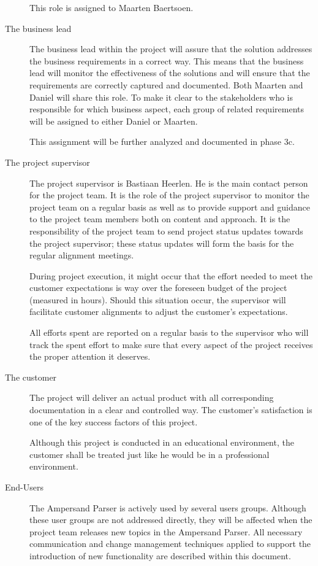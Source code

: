\begin{description}
	This role is assigned to Maarten Baertsoen.

	\item[The business lead]
	The business lead within the project will assure that the solution addresses the business requirements in a correct way. 
	This means that the business lead will monitor the effectiveness of the solutions and will ensure that the requirements are correctly captured and documented.
	Both Maarten and Daniel will share this role.
	To make it clear to the stakeholders who is responsible for which business aspect, each group of related requirements will be assigned to either Daniel or Maarten.

	This assignment  will be further analyzed and documented in phase 3c.

	\item[The project supervisor]
	The project supervisor is Bastiaan Heerlen.
	He is the main contact person for the project team.
	It is the role of the project supervisor to monitor the project team on a regular basis as well as to provide support and guidance to the project team members both on content and approach.
	It is the responsibility of the project team to send project status updates towards the project supervisor; these status updates will form the basis for the regular alignment meetings.

	During project execution, it might occur that the effort needed to meet the customer expectations is way over the foreseen budget of the project (measured in hours).
	Should this situation occur, the supervisor will facilitate customer alignments to adjust the customer's expectations.

	All efforts spent are reported on a regular basis to the supervisor who will track the spent effort to make sure that every aspect of the project receives the proper attention it deserves.

	\item[The customer]
	The project will deliver an actual product with all corresponding documentation in a clear and controlled way.
	The customer's satisfaction is one of the key success factors of this project.

	Although this project is conducted in an educational environment, the customer shall be treated just like he would be in a professional environment.

	\item[End-Users]
	The Ampersand Parser is actively used by several users groups.
	Although these user groups are not addressed directly, they will be affected when the project team releases new topics in the Ampersand Parser.
	All necessary communication and change management techniques applied to support the introduction of new functionality are described within this document.


\end{description}
